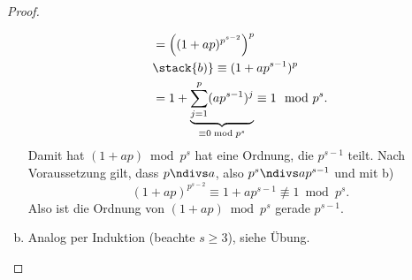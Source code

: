 \begin{lem}
\begin{proof}
\begin{enumerate}[a)]
\begin{align*}
					&= \Big( (1+ap)^{p^{s-2}} \Big)^p \\
					&\stack{b)}\equiv (1 + ap^{s-1})^p \\
					&= 1 + \underbrace{\sum_{j=1}^p (ap^{s-1})^j}_{\equiv 0 \bmod p^s}
					\equiv 1 \mod p^s.
				\end{align*}
				Damit hat $(1 + ap) \bmod p^s$ hat eine Ordnung, die $p^{s-1}$ teilt.
				Nach Voraussetzung gilt, dass $p \ndivs a$, also $p^s \ndivs ap^{s-1}$ und mit b)
				\[
					(1 + ap)^{p^{s-2}} \equiv 1 + ap^{s-1} \not\equiv 1 \bmod p^s.
				\]
				Also ist die Ordnung von $(1 + ap) \bmod p^s$ gerade $p^{s-1}$.
			\item
				Analog per Induktion (beachte $s \ge 3$), siehe Übung.
				\Exercise
		\end{enumerate}
	\end{proof}
\end{lem}

